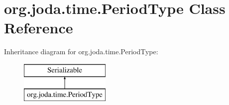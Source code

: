 \hypertarget{classorg_1_1joda_1_1time_1_1_period_type}{\section{org.\-joda.\-time.\-Period\-Type Class Reference}
\label{classorg_1_1joda_1_1time_1_1_period_type}
}
Inheritance diagram for org.\-joda.\-time.\-Period\-Type\-:\begin{figure}[H]
\begin{center}
\leavevmode
\includegraphics[height=2.000000cm]{classorg_1_1joda_1_1time_1_1_period_type}
\end{center}
\end{figure}

